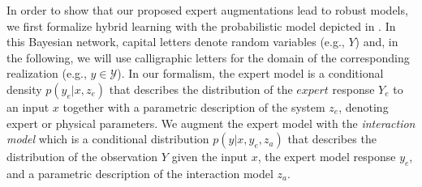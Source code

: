 In order to show that our proposed expert augmentations lead to robust models, we first formalize hybrid learning with the probabilistic model depicted in . In this Bayesian network, capital letters denote random variables (e.g., $Y$) and, in the following, we will use calligraphic letters for the domain of the corresponding realization (e.g., $y \in \mathcal{Y}$). In our formalism, the expert model is a conditional density $p(y_e|x, z_e)$ that describes the distribution of the $expert$ response $Y_e$ to an input $x$ together with a parametric description of the system $z_e$, denoting expert or physical parameters. We augment the expert model with the \textit{interaction model} which is a conditional distribution $p(y|x, y_e, z_a)$ that describes the distribution of the observation $Y$ given the input $x$, the expert model response $y_e$, and a parametric description of the interaction model $z_a$.

